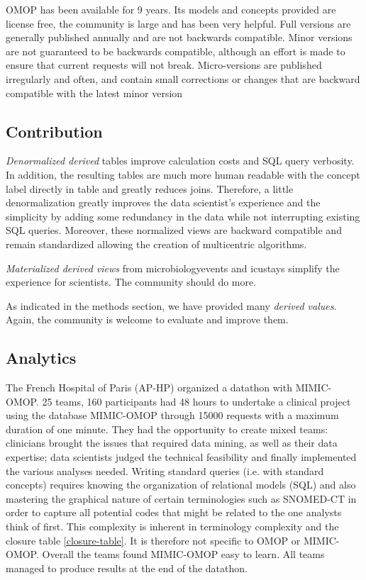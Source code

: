 OMOP has been available for 9 years. Its models and concepts provided are 
license free, the community is large and has been very helpful. Full versions 
are generally published annually and are not backwards compatible. 
Minor versions are not guaranteed to be backwards compatible, although an effort 
is made to ensure that current requests will not break. Micro-versions are 
published irregularly and often, and contain small corrections or changes 
that are backward compatible with the latest minor version \cite{omop-cdm}



\subsection{Contribution}

\emph{Denormalized derived} tables improve calculation costs and SQL query verbosity. 
In addition, the resulting tables are much more human readable with the concept 
label directly in table and greatly reduces joins. Therefore, a little 
denormalization greatly improves the data scientist's experience and the simplicity
 by adding some redundancy in the data while not interrupting existing SQL queries. 
Moreover, these normalized views are backward compatible and remain 
standardized allowing the creation of multicentric algorithms.

\emph{Materialized derived views} from microbiologyevents and icustays simplify 
the experience for scientists. The community should do more.
                    
As indicated in the methods section, we have provided many \emph{derived values}. 
Again, the community is welcome to evaluate and improve them.   


\subsection{Analytics}
The French Hospital of Paris (AP-HP) organized a datathon with MIMIC-OMOP. 
25 teams, 160 participants had 48 hours to undertake a clinical project using 
the database MIMIC-OMOP through 15000 requests with a maximum duration of
one minute. They had the opportunity to create mixed teams: clinicians brought 
the issues that required data mining, as well as their data expertise; 
data scientists judged the technical feasibility and finally implemented the 
various analyses needed. Writing standard queries (i.e. with standard concepts) 
requires knowing the organization of relational models (SQL) and also mastering 
the graphical nature of certain terminologies such as SNOMED-CT in order to 
capture all potential codes that might be related to the one analysts think of 
first. This complexity is inherent in terminology complexity and the closure 
table \ref{closure-table}. It is therefore not specific to OMOP or MIMIC-OMOP. 
Overall the teams found MIMIC-OMOP easy to learn.
All teams managed to produce results at the end of the datathon.
